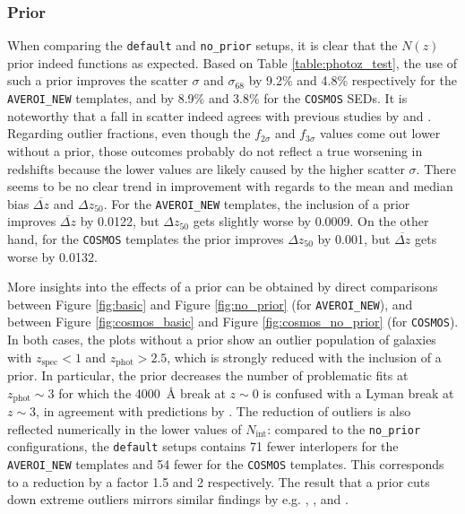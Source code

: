 \subsubsection{Prior}\label{subsubsection:discussion_prior}
When comparing the \texttt{default} and \texttt{no\_prior} setups, it is clear that the $N(z)$ prior indeed functions as expected. Based on Table \ref{table:photoz_test}, the use of such a prior improves the scatter $\sigma$ and $\sigma_{68}$ by 9.2\% and 4.8\% respectively for the \texttt{AVEROI\_NEW} templates, and by 8.9\% and 3.8\% for the \texttt{COSMOS} SEDs. It is noteworthy that a fall in scatter indeed agrees with previous studies by \cite{2006A&A...457..841I} and \cite{2015ApJ...801...20T}. Regarding outlier fractions, even though the $f_{2\sigma}$ and $f_{3\sigma}$ values come out lower without a prior, those outcomes probably do not reflect a true worsening in redshifts because the lower values are likely caused by the higher scatter $\sigma$. There seems to be no clear trend in improvement with regards to the mean and median bias $\overbar{\Delta z}$ and $\Delta z_{50}$. For the \texttt{AVEROI\_NEW} templates, the inclusion of a prior improves $\overbar{\Delta z}$ by 0.0122, but $\Delta z_{50}$ gets slightly worse by 0.0009. On the other hand, for the \texttt{COSMOS} templates the prior improves $\Delta z_{50}$ by 0.001, but $\overbar{\Delta z}$ gets worse by 0.0132. \par



More insights into the effects of a prior can be obtained by direct comparisons between Figure \ref{fig:basic} and Figure \ref{fig:no_prior} (for \texttt{AVEROI\_NEW}), and between Figure \ref{fig:cosmos_basic} and Figure \ref{fig:cosmos_no_prior} (for \texttt{COSMOS}). In both cases, the plots without a prior show an outlier population of galaxies with $z_{\mathrm{spec}}<1$ and $z_{\mathrm{phot}} > 2.5$, which is strongly reduced with the inclusion of a prior. In particular, the prior decreases the number of problematic fits at $z_{\mathrm{phot}} \sim 3$ for which the \SI{4000}{\angstrom} break at $z\sim 0$ is confused with a Lyman break at $z\sim 3$, in agreement with predictions by \cite{2000ApJ...536..571B}. The reduction of outliers is also reflected numerically in the lower values of $N_{\mathrm{int}}$: compared to the \texttt{no\_prior} configurations, the \texttt{default} setups contains 71 fewer interlopers for the \texttt{AVEROI\_NEW} templates and 54 fewer for the \texttt{COSMOS} templates. This corresponds to a reduction by a factor 1.5 and 2 respectively. The result that a prior cuts down extreme outliers mirrors similar findings by e.g. \cite{2000ApJ...536..571B}, \cite{2006A&A...457..841I}, and \cite{2015ApJ...801...20T}.\par

